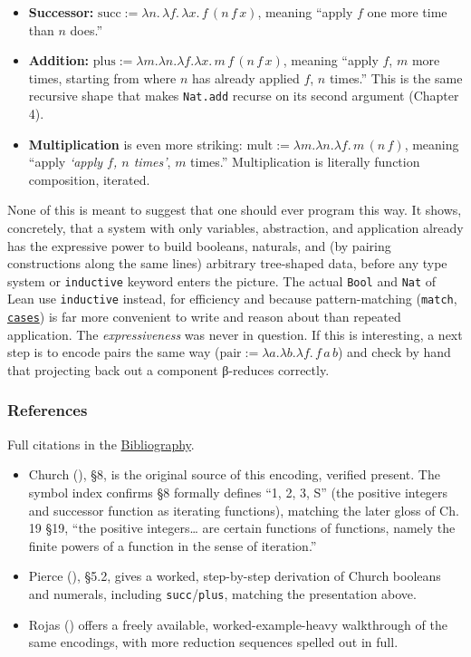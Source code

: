 \begin{itemize}
\tightlist
\item
  \textbf{Successor:} \(\mathrm{succ} := \lambda n.\, \lambda f.\, \lambda x.\, f\,(n\, f\, x)\), meaning ``apply \(f\) one more time than \(n\) does.''
\item
  \textbf{Addition:} \(\mathrm{plus} := \lambda m.\lambda n.\lambda f.\lambda x.\, m\, f\,(n\, f\, x)\), meaning ``apply \(f\), \(m\) more times, starting from where \(n\) has already applied \(f\), \(n\) times.'' This is the same recursive shape that makes \texttt{Nat.add} recurse on its second argument (Chapter 4).
\item
  \textbf{Multiplication} is even more striking: \(\mathrm{mult} := \lambda m. \lambda n.\lambda f.\, m\,(n\, f)\), meaning ``apply \emph{`apply \(f\), \(n\) times'}, \(m\) times.'' Multiplication is literally function composition, iterated.
\end{itemize}

None of this is meant to suggest that one should ever program this way. It shows, concretely, that a system with only variables, abstraction, and application already has the expressive power to build booleans, naturals, and (by pairing constructions along the same lines) arbitrary tree-shaped data, before any type system or \texttt{inductive} keyword enters the picture. The actual \texttt{Bool} and \texttt{Nat} of Lean use \texttt{inductive} instead, for efficiency and because pattern-matching (\texttt{match}, \href{https://lean-lang.org/doc/reference/latest/Tactic-Proofs/Tactic-Reference/}{\texttt{cases}}) is far more convenient to write and reason about than repeated application. The \emph{expressiveness} was never in question. If this is interesting, a next step is to encode pairs the same way (\(\mathrm{pair} := \lambda a.\lambda b.\lambda f.\, f\, a\, b\)) and check by hand that projecting back out a component β-reduces correctly.

\subsubsection{References}\label{sec:13-next-steps:03-next-projects:8}

Full citations in the \hyperref[sec:root:bibliography:1]{Bibliography}.

\begin{itemize}
\tightlist
\item
  Church (\cite{Church1941}), §8, is the original source of this encoding, verified present. The symbol index confirms §8 formally defines ``1, 2, 3, S'' (the positive integers and successor function as iterating functions), matching the later gloss of Ch. 19 §19, ``the positive integers\ldots{} are certain functions of functions, namely the finite powers of a function in the sense of iteration.''
\item
  Pierce (\cite{Pierce2002}), §5.2, gives a worked, step-by-step derivation of Church booleans and numerals, including \texttt{succ}/\texttt{plus}, matching the presentation above.
\item
  Rojas (\cite{Rojas2015}) offers a freely available, worked-example-heavy walkthrough of the same encodings, with more reduction sequences spelled out in full.
\end{itemize}
